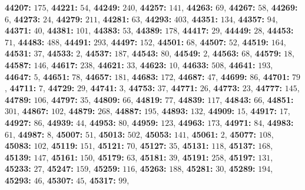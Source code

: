 \textsf{\bfseries 44207:} $175$, \textsf{\bfseries 44221:} $54$, \textsf{\bfseries 44249:} $240$, \textsf{\bfseries 44257:} $141$, \textsf{\bfseries 44263:} $69$, \textsf{\bfseries 44267:} $58$, \textsf{\bfseries 44269:} $6$, \textsf{\bfseries 44273:} $24$, \textsf{\bfseries 44279:} $211$, \textsf{\bfseries 44281:} $63$, \textsf{\bfseries 44293:} $403$, \textsf{\bfseries 44351:} $134$, \textsf{\bfseries 44357:} $94$, \textsf{\bfseries 44371:} $40$, \textsf{\bfseries 44381:} $101$, \textsf{\bfseries 44383:} $53$, \textsf{\bfseries 44389:} $178$, \textsf{\bfseries 44417:} $29$, \textsf{\bfseries 44449:} $28$, \textsf{\bfseries 44453:} $71$, \textsf{\bfseries 44483:} $488$, \textsf{\bfseries 44491:} $293$, \textsf{\bfseries 44497:} $152$, \textsf{\bfseries 44501:} $68$, \textsf{\bfseries 44507:} $52$, \textsf{\bfseries 44519:} $164$, \textsf{\bfseries 44531:} $37$, \textsf{\bfseries 44533:} $2$, \textsf{\bfseries 44537:} $187$, \textsf{\bfseries 44543:} $80$, \textsf{\bfseries 44549:} $2$, \textsf{\bfseries 44563:} $68$, \textsf{\bfseries 44579:} $18$, \textsf{\bfseries 44587:} $146$, \textsf{\bfseries 44617:} $238$, \textsf{\bfseries 44621:} $33$, \textsf{\bfseries 44623:} $10$, \textsf{\bfseries 44633:} $508$, \textsf{\bfseries 44641:} $193$, \textsf{\bfseries 44647:} $5$, \textsf{\bfseries 44651:} $78$, \textsf{\bfseries 44657:} $181$, \textsf{\bfseries 44683:} $172$, \textsf{\bfseries 44687:} $47$, \textsf{\bfseries 44699:} $86$, \textsf{\bfseries 44701:} $79$, \textsf{\bfseries 44711:} $7$, \textsf{\bfseries 44729:} $29$, \textsf{\bfseries 44741:} $3$, \textsf{\bfseries 44753:} $37$, \textsf{\bfseries 44771:} $26$, \textsf{\bfseries 44773:} $23$, \textsf{\bfseries 44777:} $145$, \textsf{\bfseries 44789:} $106$, \textsf{\bfseries 44797:} $35$, \textsf{\bfseries 44809:} $66$, \textsf{\bfseries 44819:} $77$, \textsf{\bfseries 44839:} $117$, \textsf{\bfseries 44843:} $66$, \textsf{\bfseries 44851:} $301$, \textsf{\bfseries 44867:} $102$, \textsf{\bfseries 44879:} $268$, \textsf{\bfseries 44887:} $195$, \textsf{\bfseries 44893:} $132$, \textsf{\bfseries 44909:} $15$, \textsf{\bfseries 44917:} $17$, \textsf{\bfseries 44927:} $86$, \textsf{\bfseries 44939:} $44$, \textsf{\bfseries 44953:} $80$, \textsf{\bfseries 44959:} $123$, \textsf{\bfseries 44963:} $173$, \textsf{\bfseries 44971:} $84$, \textsf{\bfseries 44983:} $61$, \textsf{\bfseries 44987:} $8$, \textsf{\bfseries 45007:} $51$, \textsf{\bfseries 45013:} $502$, \textsf{\bfseries 45053:} $141$, \textsf{\bfseries 45061:} $2$, \textsf{\bfseries 45077:} $108$, \textsf{\bfseries 45083:} $102$, \textsf{\bfseries 45119:} $151$, \textsf{\bfseries 45121:} $70$, \textsf{\bfseries 45127:} $35$, \textsf{\bfseries 45131:} $118$, \textsf{\bfseries 45137:} $168$, \textsf{\bfseries 45139:} $147$, \textsf{\bfseries 45161:} $150$, \textsf{\bfseries 45179:} $63$, \textsf{\bfseries 45181:} $39$, \textsf{\bfseries 45191:} $258$, \textsf{\bfseries 45197:} $131$, \textsf{\bfseries 45233:} $27$, \textsf{\bfseries 45247:} $159$, \textsf{\bfseries 45259:} $116$, \textsf{\bfseries 45263:} $188$, \textsf{\bfseries 45281:} $30$, \textsf{\bfseries 45289:} $194$, \textsf{\bfseries 45293:} $46$, \textsf{\bfseries 45307:} $45$, \textsf{\bfseries 45317:} $99$, 
